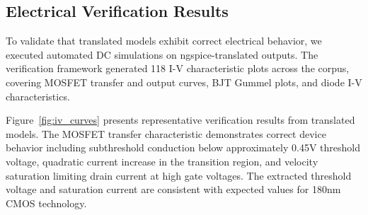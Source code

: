 \documentclass[conference]{IEEEtran}
\begin{document}
\subsection{Electrical Verification Results}

To validate that translated models exhibit correct electrical behavior, we executed automated DC simulations on ngspice-translated outputs. The verification framework generated 118 I-V characteristic plots across the corpus, covering MOSFET transfer and output curves, BJT Gummel plots, and diode I-V characteristics.

Figure~\ref{fig:iv_curves} presents representative verification results from translated models. The MOSFET transfer characteristic demonstrates correct device behavior including subthreshold conduction below approximately 0.45V threshold voltage, quadratic current increase in the transition region, and velocity saturation limiting drain current at high gate voltages. The extracted threshold voltage and saturation current are consistent with expected values for 180nm CMOS technology.
\end{document}
